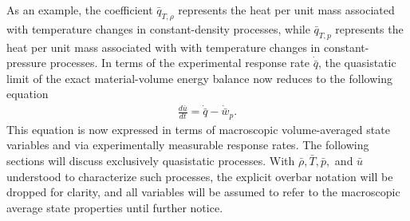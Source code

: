 As an example, the coefficient $\bar{q}_{T,\rho}$ represents the heat per unit mass associated with temperature changes in constant-density processes, while $\bar{q}_{T,p}$ represents the heat per unit mass associated with with temperature changes in constant-pressure processes. In terms of the experimental response rate $\dot{\bar{q}}$, the quasistatic limit of the exact material-volume energy balance now reduces to the following equation
\begin{align}\label{eq:quasistatic-energy-balance}
    \frac{d\bar{u}}{dt}=\dot{\bar{q}}-\dot{\bar{w}}_p.
\end{align}
This equation is now expressed in terms of macroscopic volume-averaged state variables and via experimentally measurable response rates. The following sections will discuss exclusively quasistatic processes. With $\bar{\rho}, \bar{T}, \bar{p},$ and $\bar{u}$ understood to characterize such processes, the explicit overbar notation will be dropped for clarity, and all variables will be assumed to refer to the macroscopic average state properties until further notice. 

